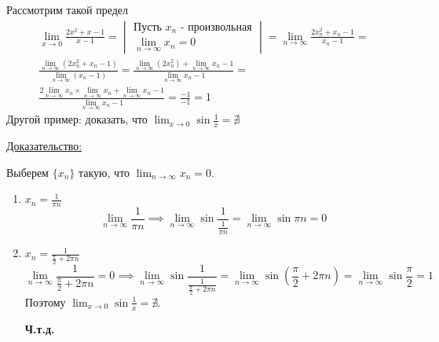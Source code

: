 \documentclass[12pt]{article}
\def\posl#1#2{\{#1_{#2}\}}
\begin{document}
    \begin{adjustwidth}{1.5em}{1.5em}
        Рассмотрим такой предел
        \begin{gather*} 
            \lim_{x\to0}\frac{2x^2+x-1}{x-1} =
            \begin{vmatrix}
                \text{Пусть }x_n\text{ - произвольная}\\
                \lim_{n\to\infty}x_n = 0
            \end{vmatrix} =
            \lim_{n\to\infty} \frac{2x_n^2+x_n-1}{x_n-1} =\\
            \frac{\lim_{n\to\infty}(2x_n^2 + x_n - 1)}{\lim_{n\to\infty}(x_n-1)} = \frac{\lim_{n\to\infty}(2x^2_n)+\lim_{n\to\infty}x_n - 1}{\lim_{n\to\infty}x_n - 1} =\\
            \frac{2\lim_{n\to\infty}x_n \times \lim_{n\to\infty}x_n + \lim_{n\to\infty}x_n - 1}{\lim_{n\to\infty}x_n - 1} = \frac{-1}{-1} = 1
        \end{gather*}
        Другой пример: доказать, что $\lim_{x\to0}\sin\frac{1}{x} = \nexists$\par\noindent
        \underline{Доказательство:}
        \begin{adjustwidth}{1.5em}{1.5em}
            Выберем $\posl{x}{n}$ такую, что $\lim_{n\to\infty}x_n = 0$.\\
            \begin{enumerate}
                \item $x_n = \frac{1}{\pi n}$
                \[ \lim_{n\to\infty}\frac{1}{\pi n} \implies \lim_{n\to\infty}\sin \frac{1}{\frac{1}{\pi n}} = \lim_{n\to\infty}\sin \pi n = 0 \]
                \item $x_n = \frac{1}{\frac{\pi}{2} + 2\pi n}$
                \[ \lim_{n\to\infty}\frac{1}{\frac{\pi}{2} + 2\pi n} = 0 \implies \lim_{n\to\infty}\sin \frac{1}{\frac{1}{\frac{\pi}{2} + 2\pi n}} = \lim_{n\to\infty} \sin(\frac{\pi}{2} + 2\pi n) = \lim_{n\to\infty}\sin \frac{\pi}{2} = 1 \]
                Поэтому $\lim_{x\to 0}\sin \frac{1}{x} = \nexists$.
                \begin{center}
                    \textbf{Ч.т.д.}
                \end{center}
            \end{enumerate}
        \end{adjustwidth}
    \end{adjustwidth}
    
\end{document}

